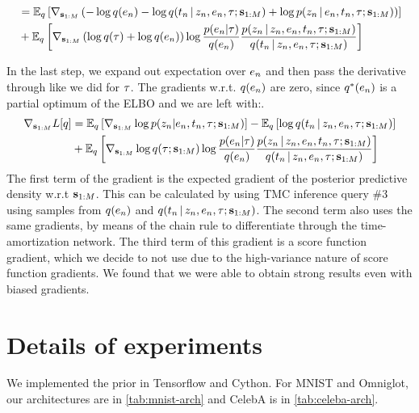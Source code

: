 \begin{equation}
\begin{split}
    &= \mathbb{E}_{q}\left[
        \nabla_{\mathbf{s}_{1:M}}\left(-\log q(e_n) - \log q(t_n \,|\, z_n, e_n, \tau; \mathbf{s}_{1:M}) + \log p(z_n \,|\, e_n, t_n, \tau; \mathbf{s}_{1:M})\right)
    \right] \\
    &+ \mathbb{E}_q\left[\nabla_{\mathbf{s}_{1:M}}\left(\log q(\tau) + \log q(e_n)\right)\log\frac{p(e_n | \tau)}{q(e_n)}\frac{p(z_n \,|\, z_n, e_n, t_n, \tau; \mathbf{s}_{1:M})}{q(t_n \,|\, z_n, e_n, \tau; \mathbf{s}_{1:M})}\right]
    \end{split}
\end{equation}
\normalsize

In the last step, we expand out expectation over $e_n$ and
then pass the derivative through like we did for $\tau$.
The gradients w.r.t. $q(e_n)$ are zero, since $q^*(e_n)$ is
a partial optimum of the ELBO and we are left with:.
\begin{equation}
    \begin{split}
        \nabla_{\mathbf{s}_{1:M}}L[q] &= \mathbb{E}_q\left[\nabla_{\mathbf{s}_{1:M}}\log p(z_n | e_n, t_n, \tau; \mathbf{s}_{1:M})\right] - \mathbb{E}_q\left[\log q(t_n \,|\, z_n, e_n, \tau; \mathbf{s}_{1:M})\right] \\
        &+ \mathbb{E}_q\left[\nabla_{\mathbf{s}_{1:M}} \log q(\tau; \mathbf{s}_{1:M})\log\frac{p(e_n | \tau)}{q(e_n)}\frac{p(z_n \,|\, z_n, e_n, t_n, \tau; \mathbf{s}_{1:M})}{q(t_n \,|\, z_n, e_n, \tau; \mathbf{s}_{1:M})}\right]
    \end{split}
\end{equation}
The first term of the gradient is the expected gradient
of the posterior predictive density w.r.t $\mathbf{s}_{1:M}$.
This can be calculated by using TMC inference query \#3
using samples from $q(e_n)$ and $q(t_n \,|\, z_n, e_n, \tau; \mathbf{s}_{1:M})$. The second term also uses the same gradients, by means
of the chain rule to differentiate through the time-amortization network.
The third term of this gradient is a score function gradient,
which we decide to not use due to the high-variance nature of score function gradients. We found that we were able to obtain strong results even with biased gradients.

\section{Details of experiments}
\label{sec:implementation-details}

We implemented the \acronym\;prior in Tensorflow
and Cython. 
For MNIST and Omniglot, our architectures are in \autoref{tab:mnist-arch} and CelebA is in \autoref{tab:celeba-arch}.

